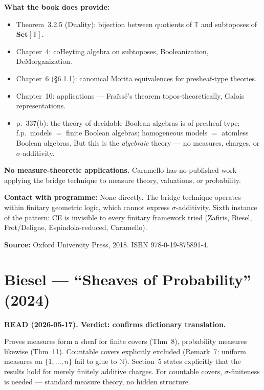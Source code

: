 \medskip\noindent
\textbf{What the book does provide:}
\begin{itemize}[nosep]
  \item Theorem~3.2.5 (Duality): bijection between quotients of
    $\mathbb{T}$ and subtoposes of $\mathbf{Set}[\mathbb{T}]$.
  \item Chapter~4: coHeyting algebra on subtoposes,
    Booleanization, DeMorganization.
  \item Chapter~6 (\S 6.1.1): canonical Morita equivalences for
    presheaf-type theories.
  \item Chapter~10: applications --- Fra\"{i}ss\'{e}'s theorem
    topos-theoretically, Galois representations.
  \item p.~337(b): the theory of decidable Boolean algebras is of
    presheaf type; f.p.\ models $=$ finite Boolean algebras;
    homogeneous models $=$ atomless Boolean algebras.  But this is
    the \emph{algebraic} theory --- no measures, charges, or
    $\sigma$-additivity.
\end{itemize}

\medskip\noindent
\textbf{No measure-theoretic applications.}  Caramello has no
published work applying the bridge technique to measure theory,
valuations, or probability.

\medskip\noindent
\textbf{Contact with programme:} None directly.  The bridge
technique operates within finitary geometric logic, which cannot
express $\sigma$-additivity.  Sixth instance of the pattern: CE is
invisible to every finitary framework tried (Zafiris, Biesel,
Frot/Deligne, Esp\'{i}ndola-reduced, Caramello).

\medskip\noindent
\textbf{Source:} Oxford University Press, 2018.
ISBN 978-0-19-875891-4.

\section{Biesel --- ``Sheaves of Probability'' (2024)}

\textbf{READ (2026-05-17).  Verdict: confirms dictionary translation.}

\medskip\noindent
Proves measures form a sheaf for finite covers (Thm~8),
probability measures likewise (Thm~11).  Countable covers
explicitly excluded (Remark~7: uniform measures on $\{1,\ldots,n\}$
fail to glue to $\mathbb{N}$).  Section~5 states explicitly that
the results hold for merely finitely additive charges.  For
countable covers, $\sigma$-finiteness is needed --- standard
measure theory, no hidden structure.

